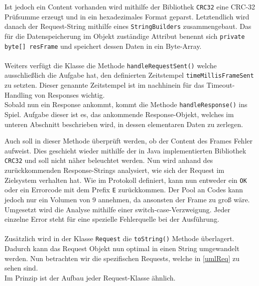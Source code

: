 Ist jedoch ein Content vorhanden wird mithilfe der Bibliothek \lstinline{CRC32} eine CRC-32 Prüfsumme erzeugt und in ein hexadezimales Format geparst.
Letztendlich wird danach der Request-String mithilfe eines \lstinline{StringBuilders} zusammengebaut.
Das für die Datenspeicherung im Objekt zuständige Attribut benennt sich \lstinline[style=java]{private byte[] resFrame} und speichert dessen Daten in ein Byte-Array.\\\\
Weiters verfügt die Klasse die Methode \lstinline[style=java]{handleRequestSent()} welche ausschließlich die Aufgabe hat, den definierten Zeitstempel \lstinline[style=java]{timeMillisFrameSent} zu setzten.
Dieser genannte Zeitstempel ist im nachhinein für das Timeout-Handling von Responses wichtig.\\
Sobald nun ein Response ankommt, kommt die Methode \lstinline[style=java]{handleResponse()} ins Spiel.
Aufgabe dieser ist es, das ankommende Response-Objekt, welches im unteren Abschnitt beschrieben wird, in dessen elementaren Daten zu zerlegen.

Auch soll in dieser Methode überprüft werden, ob der Content des Frames Fehler aufweist.
Dies geschieht wieder mithilfe der in Java implementierten Bibliothek \lstinline{CRC32} und soll nicht näher beleuchtet werden.
Nun wird anhand des zurückkommenden Response-Strings analysiert, wie sich der Request im Zielsystem verhalten hat.
Wie im Protokoll definiert, kann nun entweder ein \lstinline[style=java]{OK} oder ein Errorcode mit dem Prefix \lstinline[style=java]{E} zurückkommen.
Der Pool an Codes kann jedoch nur ein Volumen von 9 annehmen, da ansonsten der Frame zu groß wäre.
Umgesetzt wird die Analyse mithilfe einer switch-case-Verzweigung.
%
Jeder einzelne Error steht für eine spezielle Fehlerquelle bei der Ausführung.\\\\
Zusätzlich wird in der Klasse \lstinline[style=java]{Request} die \lstinline[style=java]{toString()} Methode überlagert.
Dadurch kann das Request Objekt nun optimal in einen String umgewandelt werden.
Nun betrachten wir die spezifischen Requests, welche in \autoref{umlReq} zu sehen sind.\\
Im Prinzip ist der Aufbau jeder Request-Klasse ähnlich.
